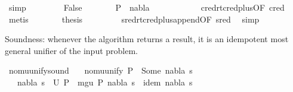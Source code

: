 \begin{isabellebody}
\ simp\isanewline
\ \ \isamarkupfalse%
\isanewline
\ \ \ \ \isamarkupfalse%
\ False\isanewline
\ \ \ \ \isamarkupfalse%
\ \isamarkupfalse%
\ {\isachardoublequoteopen}P{}\ {\isasymTurnstile}\ {\isacharparenleft}{\kern0pt}nabla{\isacharcomma}{\kern0pt}\ {\isacharbrackleft}{\kern0pt}{\isacharbrackright}{\kern0pt}{\isacharparenright}{\kern0pt}\ {\isasymRightarrow}\ {\isacharparenleft}{\kern0pt}{\isacharbrackleft}{\kern0pt}{\isacharbrackright}{\kern0pt}{\isacharcomma}{\kern0pt}{\isacharbrackleft}{\kern0pt}{\isacharbrackright}{\kern0pt}{\isacharparenright}{\kern0pt}{\isachardoublequoteclose}\ \isanewline
\ \ \ \ \ \ \isamarkupfalse%
\ cred{\isacharunderscore}{\kern0pt}rtc{\isacharunderscore}{\kern0pt}red{\isacharunderscore}{\kern0pt}plus{\isacharbrackleft}{\kern0pt}OF\ cred{\isacharbrackright}{\kern0pt}\ \isamarkupfalse%
\ metis\isanewline
\ \ \ \ \isamarkupfalse%
\ \isamarkupfalse%
\ {\isacharquery}{\kern0pt}thesis\ \isanewline
\ \ \ \ \ \ \isamarkupfalse%
\ sred{\isacharunderscore}{\kern0pt}rtc{\isacharunderscore}{\kern0pt}red{\isacharunderscore}{\kern0pt}plus{\isacharunderscore}{\kern0pt}append{\isacharbrackleft}{\kern0pt}OF\ sred{\isacharbrackright}{\kern0pt}\ \isamarkupfalse%
\ simp\isanewline
\ \ \isamarkupfalse%
\isanewline
{}\isamarkupfalse%
%
\endisatagproof
{\isafoldproof}%
%
\isadelimproof
%
\endisadelimproof
%
\begin{isamarkuptext}%
Soundness: whenever the algorithm returns a result, it is an idempotent most general 
unifier of the input problem.%
\end{isamarkuptext}\isamarkuptrue%
\isamarkupfalse%
\ nomu{\isacharunderscore}{\kern0pt}unify{\isacharunderscore}{\kern0pt}sound{\isacharcolon}{\kern0pt}\isanewline
\ \ \ {\isachardoublequoteopen}nomu{\isacharunderscore}{\kern0pt}unify\ P\ {\isacharequal}{\kern0pt}\ Some\ {\isacharparenleft}{\kern0pt}nabla{\isacharcomma}{\kern0pt}\ s{\isacharparenright}{\kern0pt}{\isachardoublequoteclose}\isanewline
\ \ \ {\isachardoublequoteopen}{\isacharparenleft}{\kern0pt}nabla{\isacharcomma}{\kern0pt}\ s{\isacharparenright}{\kern0pt}\ {\isasymin}\ U\ P\ {\isasymand}\ mgu\ P\ {\isacharparenleft}{\kern0pt}nabla{\isacharcomma}{\kern0pt}\ s{\isacharparenright}{\kern0pt}\ {\isasymand}\ idem\ {\isacharparenleft}{\kern0pt}nabla{\isacharcomma}{\kern0pt}\ s{\isacharparenright}{\kern0pt}{\isachardoublequoteclose}\isanewline

\end{isabellebody}
